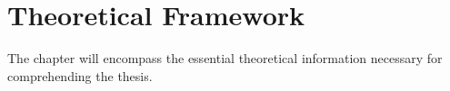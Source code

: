 \chapter{Theoretical Framework}
\label{chap:Theoretical-Framework} 
The chapter will encompass the essential theoretical information necessary for comprehending the thesis.